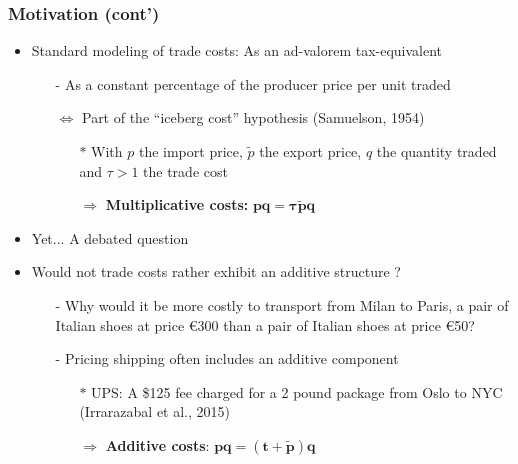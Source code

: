 \documentclass[10 pt,Helvetica, french]{beamer}
\begin{document}
\begin{frame}
\frametitle{Motivation (cont')}
\begin{itemize}
\item Standard modeling of trade costs: As an ad-valorem tax-equivalent \vspace{0.1cm}
\begin{itemize}
\item[-] As a constant percentage of the producer price per unit traded \vspace{0.1cm}
\item[$\Leftrightarrow$] Part of the ``iceberg cost'' hypothesis (Samuelson, 1954) \vspace{0.1cm}
\begin{itemize}
\item[$\ast$] With $p$ the import price, $\widetilde{p}$ the export price, $q$ the quantity traded and $\tau >1$ the trade cost \vspace{0.1cm}
\item[$\Rightarrow$] \textbf{Multiplicative costs: }    \footnotesize $\mathbf{pq = \tau \widetilde{p}q}$
\normalsize
\end{itemize}
\end{itemize}
\pause

\item Yet... A debated question \vspace{0.1cm}%
\item Would not trade costs rather exhibit an additive structure ?  \vspace{0.1cm} 
\pause
\begin{itemize}
\item[-] Why would it be more costly to transport from Milan to Paris, a pair of Italian shoes at price \euro 300 than a pair of Italian shoes at price \euro 50? \vspace{0.1cm}
\item[-] Pricing shipping often includes an additive component \vspace{0.1cm}
\pause
\begin{itemize}
\item[$\ast$] UPS: A \$125 fee charged for a 2 pound package from Oslo to NYC (Irrarazabal et al., 2015) \vspace{0.1cm}
\item[$\Rightarrow$] \textbf{Additive costs}: \footnotesize $\mathbf{pq = (t+\widetilde{p})q}  $
\end{itemize}
\end{itemize}
\end{itemize}
\end{frame}
\end{document}
